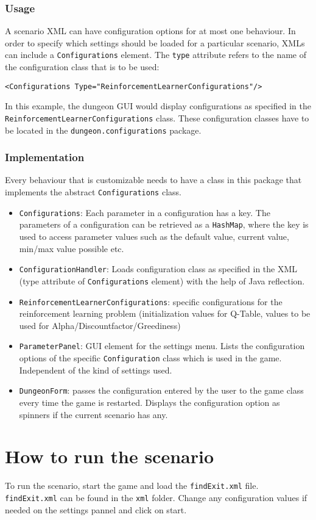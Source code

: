 \documentclass[a4paper,10pt]{scrartcl}
\begin{document}
\subsubsection{Usage}
A scenario XML can have configuration options for at most one behaviour. In order to specify which settings should be loaded for a particular scenario, XMLs can include a \verb|Configurations| element. The \verb|type| attribute refers to the name of the configuration class that is to be used:
\begin{verbatim}
<Configurations Type="ReinforcementLearnerConfigurations"/>
\end{verbatim}
In this example, the dungeon GUI would display configurations as specified in the  \verb|ReinforcementLearnerConfigurations| class. These configuration classes have to be located in the \verb|dungeon.configurations| package.


\subsubsection{Implementation}
Every behaviour that is customizable needs to have a class in this package that implements the abstract \verb|Configurations| class.
\begin{itemize}
\item \verb|Configurations|: Each parameter in a configuration has a key. The parameters of a configuration can be retrieved as a \verb|HashMap|, where the key is used to access parameter values such as the default value, current value, min/max value possible etc. 
\item \verb|ConfigurationHandler|: Loads configuration class as specified in the XML (type attribute of \verb|Configurations| element) with the help of Java reflection.
\item \verb|ReinforcementLearnerConfigurations|: specific configurations for the reinforcement learning problem (initialization values for Q-Table, values to be used for Alpha/Discountfactor/Greediness)
\end{itemize}

\begin{itemize}
\item \verb|ParameterPanel|: GUI element for the settings menu. Lists the configuration options of the specific \verb|Configuration| class which is used in the game. Independent of the kind of settings used.
\item \verb|DungeonForm|: passes  the configuration entered by the user to the game class every time the game is restarted. Displays the configuration option as spinners if the current scenario has any.
\end{itemize}


\section{How to run the scenario}\label{sec:instructions}
To run the scenario, start the game and load the \verb|findExit.xml| file. \verb|findExit.xml| can be found in the \verb|xml| folder.  Change any configuration values if needed on the settings pannel and click on start.  
\end{document}

